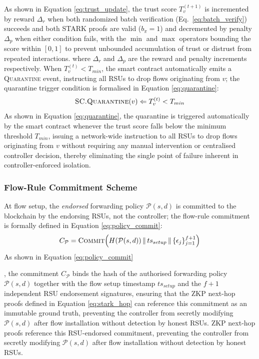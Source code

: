 \documentclass[12pt, a4paper]{report}
\begin{document}
{As shown in Equation \eqref{eq:trust_update}, the trust score
$T_v^{(t+1)}$ is incremented by reward $\Delta_r$ when both randomized batch verification (Eq.~\ref{eq:batch_verify}) succeeds and both STARK proofs are valid ($b_\pi = 1$) and decremented by penalty $\Delta_p$ when either condition fails, with the $\min$ and $\max$ operators bounding the
score within $[0,1]$ to prevent unbounded accumulation of trust or
distrust from repeated interactions.
where $\Delta_r$ and $\Delta_p$ are the reward and penalty
increments respectively. When $T_v^{(t)} < T_{min}$, the smart
contract automatically emits a \textsc{Quarantine} event,
instructing all RSUs to drop flows originating from $v$;
the quarantine trigger condition is formalised in
Equation \eqref{eq:quarantine}:
\begin{equation}
\textsc{SC.Quarantine}(v) \Leftarrow T_v^{(t)} < T_{min}
\label{eq:quarantine}
\end{equation}
As shown in Equation \eqref{eq:quarantine}, the quarantine
is triggered automatically by the smart contract whenever the trust
score falls below the minimum threshold $T_{min}$, issuing a
network-wide instruction to all RSUs to drop flows originating from
$v$ without requiring any manual intervention or centralised
controller decision, thereby eliminating the single point of failure
inherent in controller-enforced isolation.

\subsubsection{Flow-Rule Commitment Scheme}
At flow setup, the \emph{endorsed} forwarding policy
$\mathcal{P}(s,d)$ is committed to the blockchain by the endorsing
RSUs, not the controller;
the flow-rule commitment is formally defined in
Equation \eqref{eq:policy_commit}:
\begin{equation}
C_{\mathcal{P}} = \textsc{Commit}\!\left(
H(\mathcal{P}(s,d)) \,\|\, ts_{setup} \,\|\,
\{\epsilon_j\}_{j=1}^{f+1}\right)
\label{eq:policy_commit}
\end{equation}
As shown in Equation \eqref{eq:policy_commit}{, the commitment
$C_{\mathcal{P}}$ binds the hash of the authorised forwarding policy
$\mathcal{P}(s,d)$ together with the flow setup timestamp
$ts_{setup}$ and the $f+1$ independent RSU endorsement signatures,
ensuring that the ZKP next-hop proofs defined in
Equation \eqref{eq:stark_hop}{ can reference this commitment as an
immutable ground truth, preventing the controller from secretly
modifying $\mathcal{P}(s,d)$ after flow installation without
detection by honest RSUs.}
ZKP next-hop proofs reference this RSU-endorsed commitment,
preventing the controller from secretly modifying $\mathcal{P}(s,d)$
after flow installation without detection by honest RSUs.

}}
\end{document}
